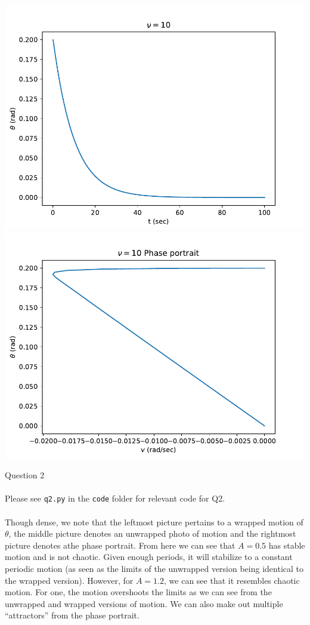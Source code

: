 \documentclass[10pt]{article} %
\begin{document}
\begin{center}
\includegraphics[width=.4\textwidth]{../figs/q1_v_10.pdf}
\includegraphics[width=.4\textwidth]{../figs/q1_v_10_phase.pdf}
\end{center}
\newpage
\noindent \Large{Question 2}
\\ \\
\noindent \normalsize{Please see \texttt{q2.py} in the \texttt{code} folder for relevant code for Q2.}
\\ \\
Though dense, we note that the leftmost picture pertains to a wrapped motion of $\theta$, the middle picture denotes an unwrapped photo of motion and the rightmost picture denotes athe phase portrait. From here we can see that $A=0.5$ has stable motion and is not chaotic. Given enough periods, it will stabilize to a constant periodic motion (as seen as the limits of the unwrapped version being identical to the wrapped version). However, for $A=1.2$, we can see that it resembles chaotic motion. For one, the motion overshoots the limits as we can see from the unwrapped and wrapped versions of motion. We can also make out multiple ``attractors'' from the phase portrait.
\end{document}

